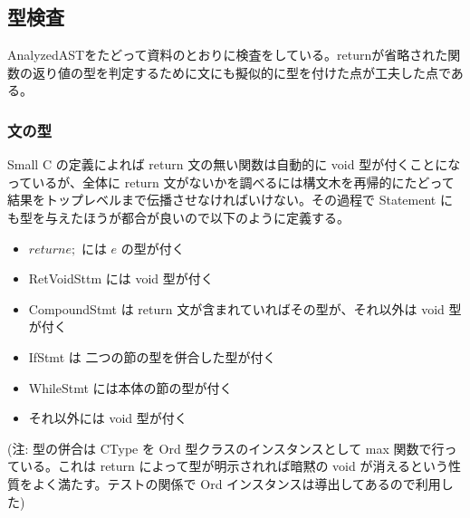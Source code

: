 \documentclass{jsarticle}
\begin{document}
\subsection{型検査}
AnalyzedASTをたどって資料のとおりに検査をしている。returnが省略された関数の返り値の型を判定するために文にも擬似的に型を付けた点が工夫した点である。
\subsubsection{文の型}
Small C の定義によれば return 文の無い関数は自動的に void 型が付くことになっているが、全体に return 文がないかを調べるには構文木を再帰的にたどって結果をトップレベルまで伝播させなければいけない。その過程で Statement にも型を与えたほうが都合が良いので以下のように定義する。
\begin{itemize}
\item $return e;$ には $e$ の型が付く
\item RetVoidSttm には void 型が付く
\item CompoundStmt は return 文が含まれていればその型が、それ以外は void 型が付く
\item IfStmt は 二つの節の型を併合した型が付く
\item WhileStmt には本体の節の型が付く
\item それ以外には void 型が付く
\end{itemize}

(注: 型の併合は CType を Ord 型クラスのインスタンスとして max 関数で行っている。これは return によって型が明示されれば暗黙の void が消えるという性質をよく満たす。テストの関係で Ord インスタンスは導出してあるので利用した)
\end{document}
